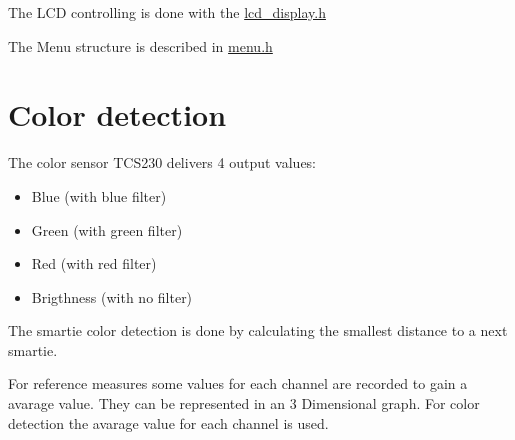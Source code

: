 The LCD controlling is done with the \hyperlink{lcd__display_8h}{lcd\_\-display.h}

The Menu structure is described in \hyperlink{menu_8h}{menu.h}\hypertarget{index_col_detect}{}\section{Color detection}\label{index_col_detect}
The color sensor TCS230 delivers 4 output values:\begin{itemize}
\item Blue (with blue filter)\item Green (with green filter)\item Red (with red filter)\item Brigthness (with no filter)\end{itemize}


The smartie color detection is done by calculating the smallest distance to a next smartie.

For reference measures some values for each channel are recorded to gain a avarage value. They can be represented in an 3 Dimensional graph. For color detection the avarage value for each channel is used.

   

